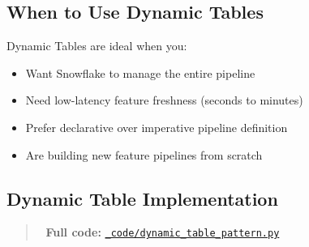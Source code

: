 \documentclass[
  letterpaper,
  DIV=11,
  numbers=noendperiod]{scrreprt}
\providecommand{\tightlist}{%
  \setlength{\itemsep}{0pt}\setlength{\parskip}{0pt}}\usepackage{longtable,booktabs,array}
\begin{document}
\hypertarget{when-to-use-dynamic-tables}{%
\subsection{When to Use Dynamic
Tables}\label{when-to-use-dynamic-tables}}

Dynamic Tables are ideal when you:

\begin{itemize}
\tightlist
\item
  Want Snowflake to manage the entire pipeline
\item
  Need low-latency feature freshness (seconds to minutes)
\item
  Prefer declarative over imperative pipeline definition
\item
  Are building new feature pipelines from scratch
\end{itemize}

\hypertarget{dynamic-table-implementation}{%
\subsection{Dynamic Table
Implementation}\label{dynamic-table-implementation}}

\begin{quote}
📁 \textbf{Full code:}
\href{_code/dynamic_table_pattern.py}{\texttt{\_code/dynamic\_table\_pattern.py}}
\end{quote}
\end{document}
